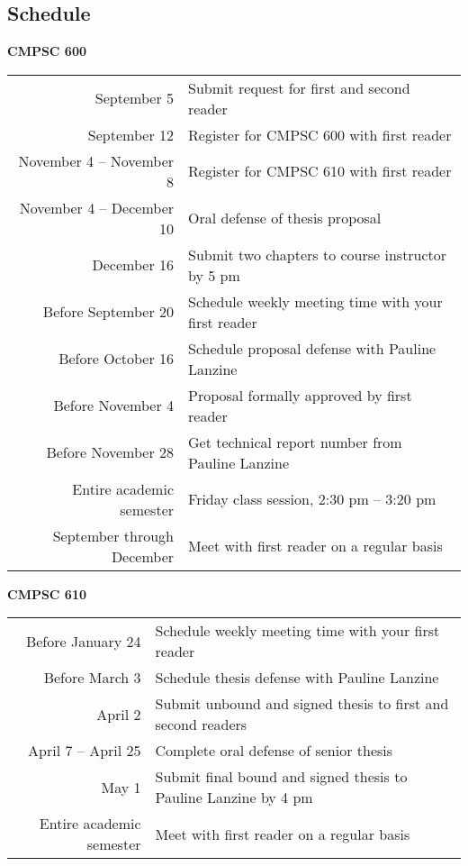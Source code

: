 \subsection*{Schedule}

{\bf CMPSC 600}
\begin{center}
\begin{tabular}{r|l}
\hline
September 5 & Submit request for first and second reader \\ 
September 12 & Register for CMPSC 600 with first reader \\ 
November 4 -- November 8 & Register for CMPSC 610 with first reader \\
November 4 -- December 10 & Oral defense of thesis proposal \\
December 16 & Submit two chapters to course instructor by 5 pm\\
\hline
Before September 20 & Schedule weekly meeting time with your first reader \\
Before October 16 & Schedule proposal defense with Pauline Lanzine \\
Before November 4 & Proposal formally approved by first reader \\
Before November 28 & Get technical report number from Pauline Lanzine\\
\hline
Entire academic semester & Friday class session, 2:30 pm -- 3:20 pm \\
September through December & Meet with first reader on a regular basis \\
\hline
\end{tabular}
\end{center}


\noindent
{\bf CMPSC 610}
\begin{center}
\begin{tabular}{r|l}
\hline
Before January 24 & Schedule weekly meeting time with your first reader \\ 
Before March 3 & Schedule thesis defense with Pauline Lanzine \\
April 2 & Submit unbound and signed thesis to first and second readers \\
April 7 -- April 25 & Complete oral defense of senior thesis \\
May 1 & Submit final bound and signed thesis to Pauline Lanzine by 4 pm\\
\hline
Entire academic semester & Meet with first reader on a regular basis \\ 
\hline
\end{tabular}
\end{center}

